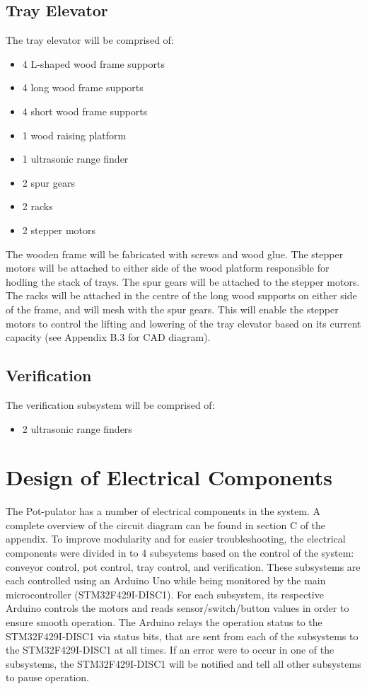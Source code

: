 \documentclass[12pt, titlepage]{article}
\begin{document}
\subsection{Tray Elevator}

The tray elevator will be comprised of:
\begin{itemize}
  \item 4 L-shaped wood frame supports
  \item 4 long wood frame supports
  \item 4 short wood frame supports
  \item 1 wood raising platform
  \item 1 ultrasonic range finder
  \item 2 spur gears
  \item 2 racks
  \item 2 stepper motors
\end{itemize}
The wooden frame will be fabricated with screws and wood glue. The stepper motors 
will be attached to either side of the wood platform responsible for hodling the 
stack of trays. The spur gears will be attached to the stepper motors. The racks 
will be attached in the centre of the long wood supports on either side of the frame, 
and will mesh with the spur gears. This will enable the stepper motors to control the 
lifting and lowering of the tray elevator based on its current capacity (see Appendix B.3
for CAD diagram).

\subsection{Verification}

The verification subsystem will be comprised of:
\begin{itemize}
  \item 2 ultrasonic range finders
\end{itemize}

\section{Design of Electrical Components}

The Pot-pulator has a number of electrical components in the system. A complete overview of the circuit diagram
can be found in section C of the appendix. To improve modularity and for easier troubleshooting,
the electrical components were divided in to 4 subsystems based on the control of the system: conveyor control, pot
control, tray control, and verification. These subsystems are each controlled using an 
Arduino Uno while being monitored by the main microcontroller (STM32F429I-DISC1). For each subsystem,
its respective Arduino controls the motors and reads sensor/switch/button values in order to ensure smooth operation. 
The Arduino relays the operation status to the STM32F429I-DISC1 via status bits, that are sent from each of the 
subsystems to the STM32F429I-DISC1 at all times. If an error were to occur in
one of the subsystems, the STM32F429I-DISC1 will be notified and tell all other subsystems to pause operation.
\end{document}
